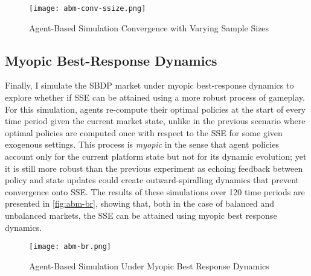 \begin{figure}[ht] 
    \centering
    \caption{Agent-Based Simulation Convergence with Varying Sample Sizes}
    \texttt{[image: abm-conv-ssize.png]}
    \label{fig:abm-conv-ssize}
\end{figure} 

\subsection{Myopic Best-Response Dynamics}
Finally, I simulate the SBDP market under myopic best-response dynamics \citep{fudenberg1998theory} to explore whether if SSE can be attained using a more robust process of gameplay. 
For this simulation, agents re-compute their optimal policies at the start of every time period given the current market state, unlike in the previous scenario where optimal policies are computed once with respect to the SSE for some given exogenous settings. 
This process is \textit{myopic} in the sense that agent policies account only for the current platform state but not for its dynamic evolution; yet it is still more robust than the previous experiment as echoing feedback between policy and state updates could create outward-spiralling dynamics that prevent convergence onto SSE. 
The results of these simulations over 120 time periods are presented in \autoref{fig:abm-br}, showing that, both in the case of balanced and unbalanced markets, the SSE can be attained using myopic best response dynamics.

\begin{figure}[ht] 
    \centering
    \caption{Agent-Based Simulation Under Myopic Best Response Dynamics}
    \texttt{[image: abm-br.png]}
    \label{fig:abm-br}
\end{figure}  


